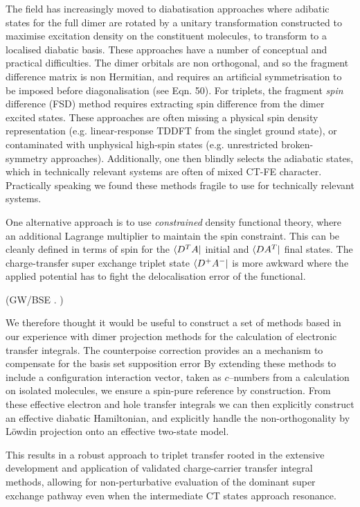 \documentclass[aps,physrev,reprint,superscriptaddress,nofootinbib,amsmath,amssymb,a4paper]{revtex4-2}
\DeclarePairedDelimiter\bra{\langle}{\rvert}
\begin{document}
The field has increasingly moved to diabatisation approaches where adibatic states for the full dimer are rotated by a unitary transformation constructed to maximise excitation density on the constituent molecules, to transform to a localised diabatic basis\cite{You2013}. 
These approaches have a number of conceptual and practical difficulties. 
The dimer orbitals are non orthogonal, and so the fragment difference matrix is non Hermitian, and requires an artificial symmetrisation to be imposed before diagonalisation (see \cite{You2013} Eqn. 50). 
For triplets, the fragment \emph{spin} difference (FSD) method requires extracting spin difference from the dimer excited states. 
These approaches are often missing a physical spin density representation (e.g. linear-response TDDFT from the singlet ground state), or contaminated with unphysical high-spin states (e.g. unrestricted broken-symmetry approaches). 
Additionally, one then blindly selects the adiabatic states, which in technically relevant systems are often of mixed CT-FE character. 
Practically speaking we found these methods fragile to use for technically relevant systems. 

One alternative approach is to use \emph{constrained} density functional theory\cite{Yeganeh2010}, where an additional Lagrange multiplier to maintain the spin constraint. 
This can be cleanly defined in terms of spin for the $\bra{D^TA}$ initial and $\bra{DA^T}$ final states.  
The charge-transfer super exchange triplet state $\bra{D^+A^-}$ is more awkward where the applied potential has to fight the delocalisation error of the functional.

(GW/BSE \cite{Wehner2017}. )

We therefore thought it would be useful to construct a set of methods based in our experience with dimer projection methods for the calculation of electronic transfer integrals. 
The counterpoise correction provides an a mechanism to compensate for the basis set supposition error 
By extending these methods to include a configuration interaction vector, taken as $c$--numbers from a calculation on isolated molecules, we ensure a spin-pure reference by construction. 
From these effective electron and hole transfer integrals we can then explicitly construct an effective diabatic Hamiltonian, and explicitly handle the non-orthogonality by L\"owdin projection onto an effective two-state model. 

This results in a robust approach to triplet transfer rooted in the extensive development and application of validated charge-carrier transfer integral methods, allowing for non-perturbative evaluation of the dominant super exchange pathway even when the intermediate CT states approach resonance. 
\end{document}
